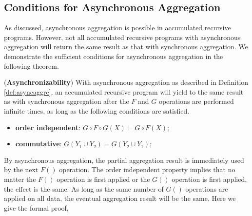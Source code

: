 \subsection{Conditions for Asynchronous Aggregation}
\label{sec:async:condition}

As discussed, asynchronous aggregation is possible in accumulated recursive programs. However, not all accumulated recursive programs with asynchronous aggregation will return the same result as that with synchronous aggregation. We demonstrate the sufficient conditions for asynchronous aggregation in the following theorem.

\begin{theorem}
	\label{th:async}
	(\textbf{Asynchronizability}) With asynchronous aggregation as described in Definition \ref{def:asyncaggre}, an accumulated recursive program will yield to the same result as with synchronous aggregation after the $F$ and $G$ operations are performed infinite times, as long as the following conditions are satisfied.
	\begin{itemize}
		\item \textbf{order independent}: $G\circ F\circ G(X)=G\circ F(X)$;
		\item \textbf{commutative}: $G(Y_1\cup Y_2)=G(Y_2\cup Y_1)$;
	\end{itemize}
\end{theorem}

By asynchronous aggregation, the partial aggregation result is immediately used by the next $F()$ operation. The order independent property implies that no matter the $F()$ operation is first applied or the $G()$ operation is first applied, the effect is the same. As long as the same number of $G()$ operations are applied on all data, the eventual aggregation result will be the same.%
Here we give the formal proof, 

